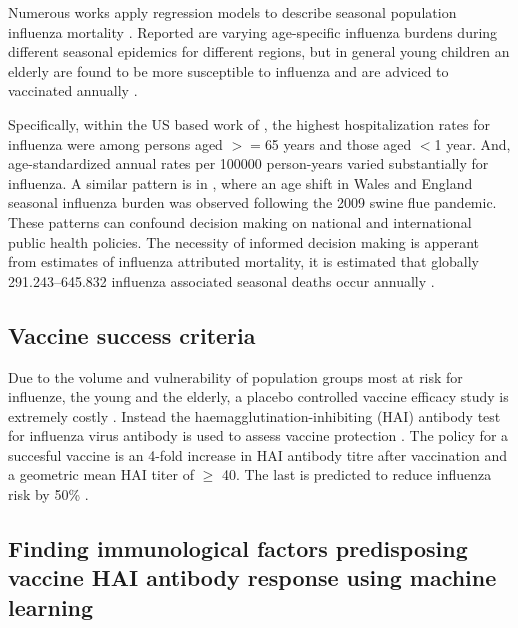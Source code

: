 Numerous works apply regression models to describe seasonal population
influenza mortality \citep{zhouHospitalizationsAssociatedInfluenza2012,
greenMortalityAttributableInfluenza2013, iulianoEstimatesGlobalSeasonal2018}.
Reported are varying age-specific influenza burdens during different seasonal
epidemics for different regions, but in general young children an elderly are
found to be more susceptible to influenza and are adviced to vaccinated
annually \citep{zhouHospitalizationsAssociatedInfluenza2012}.

Specifically, within the US based work of
\cite{zhouHospitalizationsAssociatedInfluenza2012}, the highest hospitalization
rates for influenza were among persons aged $>=$65 years and those aged $<$1 year.
And, age-standardized annual rates per 100000 person-years varied substantially
for influenza. A similar pattern is in
\cite{greenMortalityAttributableInfluenza2013}, where an age shift in Wales and
England seasonal influenza burden was observed following the 2009 swine flue
pandemic. These patterns can confound decision making on national and
international public health policies. The necessity of informed decision making
is apperant from estimates of influenza attributed mortality, it is
estimated that globally 291.243–645.832 influenza associated seasonal deaths
occur annually \citep{iulianoEstimatesGlobalSeasonal2018}.

\subsection{Vaccine success criteria}

Due to the volume and vulnerability of population groups most at risk for
influenze, the young and the elderly, a placebo controlled vaccine efficacy
study is extremely costly \citep{zhouHospitalizationsAssociatedInfluenza2012}.
Instead the haemagglutination-inhibiting (HAI) antibody test for influenza
virus antibody is used to assess vaccine protection
\citep{dejongHaemagglutinationinhibitingAntibodyInfluenza2003}. The policy for
a succesful vaccine is an 4-fold increase in HAI antibody titre after
vaccination and a geometric mean HAI titer of $\geq$ 40. The last is predicted
to reduce influenza risk by 50\%
\cite{dejongHaemagglutinationinhibitingAntibodyInfluenza2003}.

\subsection{Finding immunological factors predisposing vaccine HAI antibody response using machine learning}

